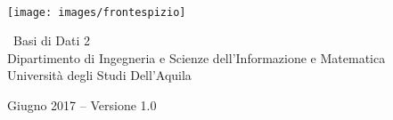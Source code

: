 
\begin{titlepage}

\begin{addmargin}[-1cm]{-1cm}
\begin{center}
\large

\hfill
\vfill

\begingroup
\color{black} \\ \bigskip %
\endgroup


\vfill

\texttt{[image: images/frontespizio]} \\ \medskip %

\vfill
\
Basi di Dati 2 \\ \medskip %
Dipartimento di Ingegneria e Scienze dell'Informazione e Matematica \\
Università degli Studi Dell'Aquila \\ \bigskip

Giugno 2017 -- Versione 1.0 %

\vfill

\end{center}
\end{addmargin}

\end{titlepage}